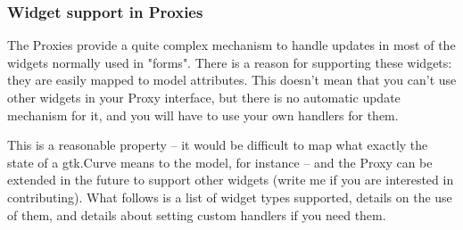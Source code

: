 \documentclass[a4paper]{howto}
\begin{document}
\subsubsection{Widget support in Proxies}

The Proxies provide a quite complex mechanism to handle updates in most
of the widgets normally used in "forms". There is a reason for
supporting these widgets: they are easily mapped to model attributes.
This doesn't mean that you can't use other widgets in your Proxy
interface, but there is no automatic update mechanism for it, and you
will have to use your own handlers for them.

This is a reasonable property -- it would be difficult to map what
exactly the state of a gtk.Curve means to the model, for instance -- and
the Proxy can be extended in the future to support other widgets (write
me if you are interested in contributing). What follows is a list of
widget types supported, details on the use of them, and details about
setting custom handlers if you need them.
\end{document}
